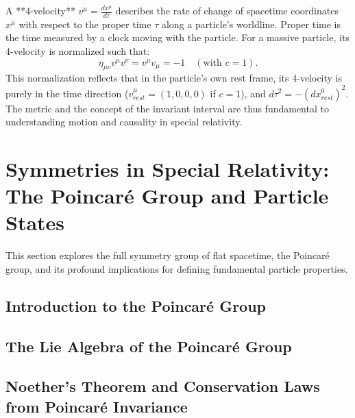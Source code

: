 \documentclass{amsart}
\theoremstyle{definition}
\theoremstyle{remark}
\begin{document}
A **4-velocity** $v^\mu = \frac{dx^\mu}{d\tau}$ describes the rate of change of spacetime coordinates $x^\mu$ with respect to the proper time $\tau$ along a particle's worldline. Proper time is the time measured by a clock moving with the particle. For a massive particle, its 4-velocity is normalized such that:
\begin{equation*}
\eta_{\mu\nu} v^\mu v^\nu = v^\mu v_\mu = -1 \quad (\text{with } c=1).
\end{equation*}
This normalization reflects that in the particle's own rest frame, its 4-velocity is purely in the time direction ($v^\mu_{rest} = (1,0,0,0)$ if $c=1$), and $d\tau^2 = -(dx^0_{rest})^2$. The metric and the concept of the invariant interval are thus fundamental to understanding motion and causality in special relativity.

\section{Symmetries in Special Relativity: The Poincaré Group and Particle States}
\label{sec:poincare_particle_states}

This section explores the full symmetry group of flat spacetime, the Poincaré group, and its profound implications for defining fundamental particle properties.

\subsection{Introduction to the Poincaré Group}
\label{subsec:intro_poincare}

\subsection{The Lie Algebra of the Poincaré Group}
\label{subsec:poincare_algebra}

\subsection{Noether's Theorem and Conservation Laws from Poincaré Invariance}
\label{subsec:noether_poincare}
\end{document}
